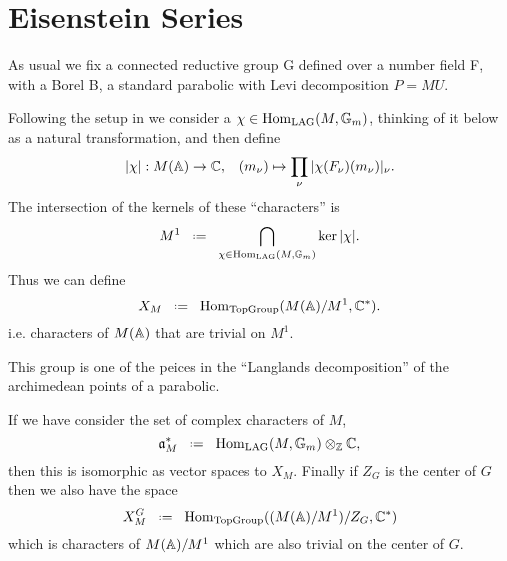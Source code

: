 \section{Eisenstein Series}
As usual we fix a connected reductive group G defined over a number field F, with a Borel B, a standard parabolic with Levi decomposition \(P = MU\). 

Following the setup in \cite[I.1.4]{moeglinSpectralDecompositionEisenstein1995} we consider a \(\chi\in \operatorname{Hom}_{\mathrm{LAG}}(M, \mathbb{G}_m)\), thinking of it below as a natural transformation, and then define 
\[|\chi|: M(\A)\to \C , \;\;\; (m_\nu)\mapsto \prod_\nu|\chi(F_\nu)(m_\nu)|_\nu.\]
The intersection of the kernels of these ``characters'' is 
\[M^1 \defeq \bigcap_{\chi\in \Hom_{\mathrm{LAG}}(M, \mathbb{G}_m)}\ker |\chi|.\]
Thus we can define
\[X_M \defeq \Hom_{\textrm{TopGroup}}(M(\A)/M^1, \C^*) .\]
i.e. characters of \(M(\A)\) that are trivial on \(M^1\).
\begin{remark}
    This group is one of the peices in the ``Langlands decomposition'' \cite[4.9]{getzIntroductionAutomorphicRepresentations2024} of the archimedean points of a parabolic. 
\end{remark}
If we have consider the set of complex characters of \(M\),
\[\mathfrak{a}_M^* \defeq \Hom_{\mathrm{LAG}}(M, \mathbb{G}_m )\tensor_\Z \C,\]
then this is isomorphic as \C vector spaces to \(X_M\). Finally if \(Z_G\) is the center of \(G\) then we also have the space 
\[X_M^G \defeq \Hom_{\textrm{TopGroup}}((M(\A)/M^1)/Z_G, \C^*)\]
which is characters of \(M(\A)/M^1\) which are also trivial on the center of \(G\).

